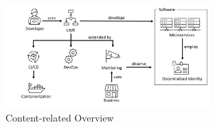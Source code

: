 \begin{figure}[tb]
	\centering
	\includegraphics[width=0.7\textwidth]{figures/1.1_content_overview.png}
	\caption{Content-related Overview}
	\label{fig:content_overview}
\end{figure}